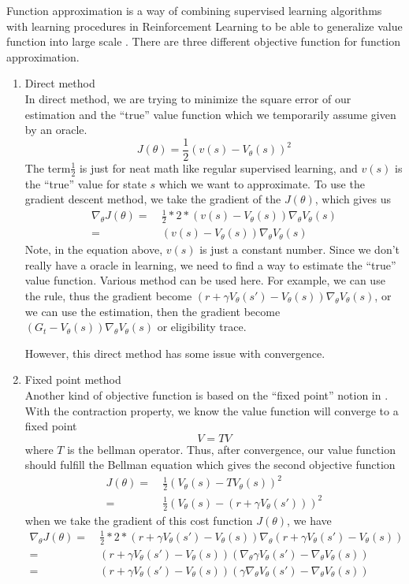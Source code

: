 \documentclass[9pt]{article}
\begin{document}
 Function approximation is a way of combining supervised learning algorithms with learning procedures in Reinforcement Learning to be able to generalize value function into large scale . There are three different objective function for function approximation. 
\begin{enumerate}
\item Direct method\\
In direct method, we are trying to minimize the square error of our estimation and the ``true'' value function which we temporarily assume given by an oracle.
\[
J(\theta) = \frac{1}{2}(v(s) - V_{\theta}(s))^2
\]
The term$\frac{1}{2}$ is just for neat math like regular supervised learning, and $v(s)$ is the ``true'' value for state $s$ which we want to approximate. To use the gradient descent method, we take the gradient of the $J(\theta)$, which gives us
\[
\begin{split}
\nabla_{\theta} J(\theta) = &\ \frac{1}{2} * 2 * (v(s) - V_{\theta}(s)) \nabla_{\theta} V_{\theta}(s)\\
= &\ (v(s) - V_{\theta}(s)) \nabla_{\theta} V_{\theta}(s)
\end{split}
\]
Note, in the equation above, $v(s)$ is just a constant number. Since we don't really have a oracle in learning, we need to find a way to estimate the ``true'' value function. Various method can be used here. For example, we can use the  rule, thus the gradient become $(r + \gamma V_{\theta}(s') - V_{\theta}(s)) \nabla_{\theta} V_{\theta}(s)$, or we can use the  estimation, then the gradient become $(G_t - V_{\theta}(s)) \nabla_{\theta} V_{\theta}(s)$ or eligibility trace.

However, this direct method has some issue with convergence. 
\item Fixed point method\\
Another kind of objective function is based on the ``fixed point'' notion in . With the contraction property, we know the value function will converge to a fixed point
\[
	V = TV
\]
where $T$ is the bellman operator. Thus, after convergence, our value function should fulfill the Bellman equation which gives the second objective function
\[
\begin{split}
J(\theta) = &\ \frac{1}{2}(V_{\theta}(s) - TV_{\theta}(s))^2\\
= &\ \frac{1}{2}(V_{\theta}(s)-(r+\gamma V_{\theta}(s')))^2
\end{split}
\]
when we take the gradient of this cost function $J(\theta)$, we have
\[
\begin{split}
\nabla_{\theta} J(\theta) = &\ \frac{1}{2} * 2 * (r+\gamma V_{\theta}(s') - V_{\theta}(s)) \nabla_{\theta} (r+\gamma V_{\theta}(s') - V_{\theta}(s))\\
= &\ (r+\gamma V_{\theta}(s') - V_{\theta}(s)) (\nabla_{\theta} \gamma V_{\theta}(s') - \nabla_{\theta}  V_{\theta}(s))\\
= &\ (r+\gamma V_{\theta}(s') - V_{\theta}(s)) (\gamma \nabla_{\theta} V_{\theta}(s') - \nabla_{\theta}  V_{\theta}(s))
\end{split}
\]


\end{enumerate}
\end{document}
